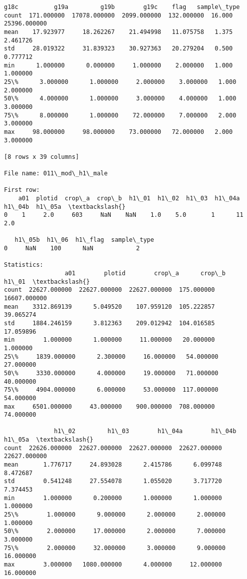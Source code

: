 \documentclass[11pt]{article}
\begin{document}
\begin{Verbatim}[commandchars=\\\{\}]
             g18c          g19a         g19b        g19c    flag   sample\_type  
count  171.000000  17078.000000  2099.000000  132.000000  16.000  25396.000000  
mean    17.923977     18.262267    21.494998   11.075758   1.375      2.461726  
std     28.019322     31.839323    30.927363   20.279204   0.500      0.777712  
min      1.000000      0.000000     1.000000    2.000000   1.000      1.000000  
25\%      3.000000      1.000000     2.000000    3.000000   1.000      2.000000  
50\%      4.000000      1.000000     3.000000    4.000000   1.000      3.000000  
75\%      8.000000      1.000000    72.000000    7.000000   2.000      3.000000  
max     98.000000     98.000000    73.000000   72.000000   2.000      3.000000  

[8 rows x 39 columns]

File name: 011\_mod\_h1\_male

First row: 
    a01  plotid  crop\_a  crop\_b  h1\_01  h1\_02  h1\_03  h1\_04a  h1\_04b  h1\_05a  \textbackslash{}
0    1     2.0     603     NaN    NaN    1.0    5.0       1      11     2.0   

   h1\_05b  h1\_06  h1\_flag  sample\_type  
0     NaN    100      NaN            2  

Statistics: 
                 a01        plotid        crop\_a      crop\_b         h1\_01  \textbackslash{}
count  22627.000000  22627.000000  22627.000000  175.000000  16607.000000   
mean    3312.869139      5.049520    107.959120  105.222857     39.065274   
std     1884.246159      3.812363    209.012942  104.016585     17.059896   
min        1.000000      1.000000     11.000000   20.000000      1.000000   
25\%     1839.000000      2.300000     16.000000   54.000000     27.000000   
50\%     3330.000000      4.000000     19.000000   71.000000     40.000000   
75\%     4904.000000      6.000000     53.000000  117.000000     54.000000   
max     6501.000000     43.000000    900.000000  708.000000     74.000000   

              h1\_02         h1\_03        h1\_04a        h1\_04b        h1\_05a  \textbackslash{}
count  22626.000000  22627.000000  22627.000000  22627.000000  22627.000000   
mean       1.776717     24.893028      2.415786      6.099748      8.472687   
std        0.541248     27.554078      1.055020      3.717720      7.374453   
min        1.000000      0.200000      1.000000      1.000000      1.000000   
25\%        1.000000      9.000000      2.000000      2.000000      1.000000   
50\%        2.000000     17.000000      2.000000      7.000000      3.000000   
75\%        2.000000     32.000000      3.000000      9.000000     16.000000   
max        3.000000   1080.000000      4.000000     12.000000     16.000000   


\end{Verbatim}
\end{document}

